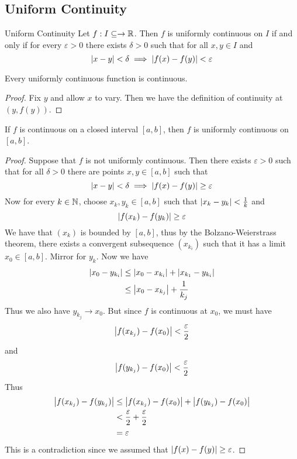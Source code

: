 \documentclass[a4paper]{article}
\begin{document}
\subsection{Uniform Continuity}
\begin{defn}{Uniform Continuity}{} Let $f:I\subseteq\to\mathbb{R}$. Then $f$ is uniformly continuous on $I$ if and only if for every $\varepsilon>0$ there exists $\delta>0$ such that for all $x,y\in I$ and $$\abs{x-y}<\delta\implies\abs{f(x)-f(y)}<\varepsilon$$ 
\end{defn}

\begin{prp}{}{} Every uniformly continuous function is continuous. \tcbline
\begin{proof} Fix $y$ and allow $x$ to vary. Then we have the definition of continuity at $(y,f(y))$. 
\end{proof}
\end{prp}

\begin{thm}{}{} If $f$ is continuous on a closed interval $[a,b]$, then $f$ is uniformly continuous on $[a,b]$. \tcbline
\begin{proof} Suppose that $f$ is not uniformly continuous. Then there exists $\varepsilon>0$ such that for all $\delta>0$ there are points $x,y\in[a,b]$ such that $$\abs{x-y}<\delta\implies\abs{f(x)-f(y)}\geq\varepsilon$$ Now for every $k\in\mathbb{N}$, choose $x_k,y_k\in[a,b]$ such that $\abs{x_k-y_k}<\frac{1}{k}$ and $$\abs{f(x_k)-f(y_k)}\geq\varepsilon$$ We have that $(x_k)$ is bounded by $[a,b]$, thus by the Bolzano-Weierstrass theorem, there exists a convergent subsequence $(x_{k_i})$ such that it has a limit $x_0\in[a,b]$. Mirror for $y_k$. Now we have 
\begin{align*}
\abs{x_0-y_{k_i}}&\leq\abs{x_0-x_{k_i}}+\abs{x_{k_1}-y_{k_i}}\\
&\leq\abs{x_0-x_{k_j}}+\frac{1}{k_j}
\end{align*}
Thus we also have $y_{k_j}\to x_0$. But since $f$ is continuous at $x_0$, we must have $$\abs{f(x_{k_j})-f(x_0)}<\frac{\varepsilon}{2}$$ and $$\abs{f(y_{k_j})-f(x_0)}<\frac{\varepsilon}{2}$$ Thus
\begin{align*}
\abs{f(x_{k_j})-f(y_{k_j})}&\leq\abs{f(x_{k_j})-f(x_0)}+\abs{f(y_{k_j})-f(x_0)}\\
&<\frac{\varepsilon}{2}+\frac{\varepsilon}{2}\\
&=\varepsilon
\end{align*} This is a contradiction since we assumed that $\abs{f(x)-f(y)}\geq\varepsilon$. 
\end{proof}
\end{thm}
\end{document}
